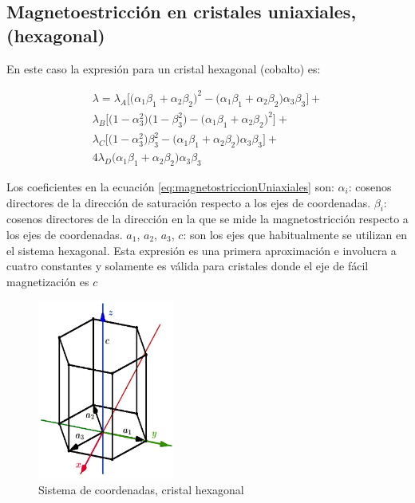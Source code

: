 \subsection{Magnetoestricción en cristales uniaxiales, (hexagonal)}

En este caso la expresión para un cristal hexagonal (cobalto) es:

\begin{multline}
\lambda = \lambda_{A} \big[ \big( \alpha_{1}\beta_{1}+\alpha_{2}\beta_{2}\big)^{2}-\big( \alpha_{1}\beta_{1}+\alpha_{2}\beta_{2}\big)\alpha_{3}\beta_{3}\big] + \\
\lambda_{B} \big[ \big(1- \alpha_{3}^{2}\big)\big(1-\beta_{3}^{2}\big)-\big( \alpha_{1}\beta_{1}+\alpha_{2}\beta_{2}\big)^{2} \big] + \\
\lambda_{C} \big[ \big( 1- \alpha_{3}^{2}\big)\beta_{3}^{2}-\big( \alpha_{1}\beta_{1}+\alpha_{2}\beta_{2}\big)\alpha_{3}\beta_{3} \big] + \\
4\lambda_{D} \big( \alpha_{1}\beta_{1}+\alpha_{2}\beta_{2}\big)\alpha_{3}\beta_{3}
	\label{eq:magnetostriccionUniaxiales}
\end{multline}

Los coeficientes en la ecuación \ref{eq:magnetostriccionUniaxiales} son:
$\alpha_{i}$: cosenos directores de la dirección de saturación respecto a los ejes de coordenadas.
$\beta_{i}$: cosenos directores de la dirección en la que se mide la magnetostricción respecto a los ejes de coordenadas.
$a_{1}$, $a_{2}$, $a_{3}$, $c$: son los ejes que habitualmente se utilizan en el sistema hexagonal.
Esta expresión es una primera aproximación e involucra a cuatro constantes y solamente es válida para cristales donde el eje de fácil magnetización es $c$

\begin{figure}[H]
    \centering
    \includegraphics[width=0.4\textwidth]{./Figures/MagnetoestriccionEnCristalesUniaxiales}
	\caption{Sistema de coordenadas, cristal hexagonal}
	\label{fig:MagnetoestriccionEnCristalesUniaxiales}
\end{figure}


